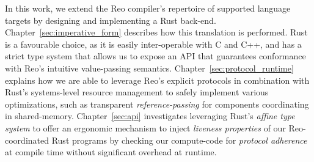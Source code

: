 In this work, we extend the Reo compiler's repertoire of supported language targets by designing and implementing a Rust back-end. Chapter~\ref{sec:imperative_form} describes how this translation is performed. Rust is a favourable choice, as it is easily inter-operable with C and C++, and has a strict type system that allows us to expose an API that guarantees conformance with Reo's intuitive value-passing semantics. Chapter~\ref{sec:protocol_runtime} explains how we are able to leverage Reo's explicit protocols in combination with Rust's systems-level resource management to safely implement various optimizations, such as transparent \textit{reference-passing} for components coordinating in shared-memory. Chapter~\ref{sec:api} investigates leveraging Rust's \textit{affine type system} to offer an ergonomic mechanism to inject \textit{liveness properties} of our Reo-coordinated Rust programs by checking our compute-code for \textit{protocol adherence} at compile time without significant overhead at runtime.

